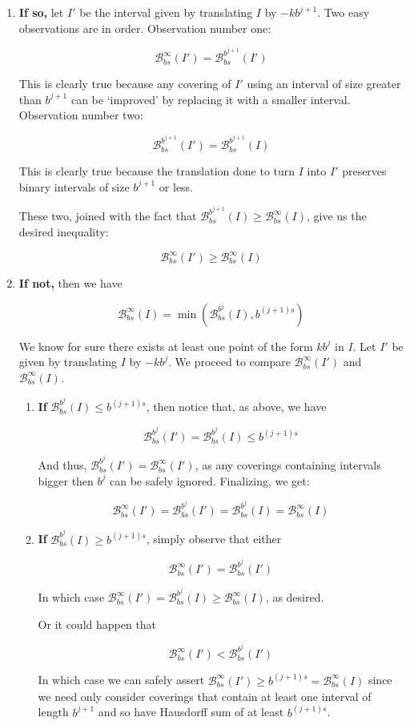 \documentclass[11pt, reqno]{amsart}
\newcommand{\BB}{\mathcal{B}}
\begin{document}
\begin{enumerate}

\item \textbf{If so,} let $I'$ be the interval given by translating $I$ by $-k b^{j+1}$. Two easy observations are in order. Observation number one:

\[\BB_{bs}^\infty(I') = \BB_{bs}^{b^{j+1}}(I')\]

This is clearly true because any covering of $I'$ using an interval of size greater than $b^{j+1}$ can be `improved' by replacing it with a smaller interval. Observation number two:

\[\BB_{bs}^{b^{j+1}}(I') = \BB_{bs}^{b^{j+1}}(I)\]

This is clearly true because the translation done to turn $I$ into $I'$ preserves binary intervals of size $b^{j+1}$ or less.

These two, joined with the fact that $\BB_{bs}^{b^{j+1}}(I) \geq \BB_{bs}^\infty(I)$, give us the desired inequality:

\[\BB_{bs}^\infty(I') \geq \BB_{bs}^\infty(I)\]

\item \textbf{If not,} then we have

\[\BB_{bs}^\infty(I) = \min(\BB_{bs}^{b^j}(I), b^{(j+1)s})\]

We know for sure there exists at least one point of the form $k b^j$ in $I$. Let $I'$ be given by translating $I$ by $-k b^j$. We proceed to compare $\BB_{bs}^\infty(I')$ and $\BB_{bs}^\infty(I)$.

\begin{enumerate}

\item \textbf{If} $\BB_{bs}^{b^j}(I) \leq b^{(j+1)s}$, then notice that, as above, we have

\[\BB_{bs}^{b^j}(I') = \BB_{bs}^{b^j}(I) \leq b^{(j+1)s}\]

And thus, $\BB_{bs}^{b^j}(I') = \BB_{bs}^\infty(I')$, as any coverings containing intervals bigger then $b^j$ can be safely ignored. Finalizing, we get:

\[\BB_{bs}^\infty(I') = \BB_{bs}^{b^j}(I') = \BB_{bs}^{b^j}(I) = \BB_{bs}^\infty(I)\]

\item \textbf{If} $\BB_{bs}^{b^j}(I) \geq b^{(j+1)s}$, simply observe that either

\[\BB_{bs}^\infty(I') = \BB_{bs}^{b^j}(I')\]

In which case $\BB_{bs}^\infty(I') = \BB_{bs}^{b^j}(I) \geq \BB_{bs}^\infty(I)$, as desired.

Or it could happen that

\[\BB_{bs}^\infty(I') < \BB_{bs}^{b^j}(I')\]

In which case we can safely assert $\BB_{bs}^\infty(I') \geq b^{(j+1)s} = \BB_{bs}^\infty(I)$ since we need only consider coverings that contain at least one interval of length $b^{j+1}$ and so have Hausdorff sum of at least $b^{(j+1)s}$.
\end{enumerate}
\end{enumerate}
\end{document}
